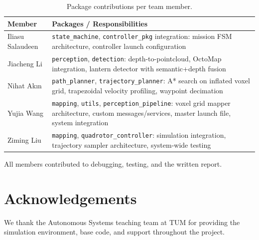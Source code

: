 \documentclass[twocolumn]{article}
\begin{document}
\begin{table}[h]
\centering
\caption{Package contributions per team member.}
\label{tab:contributions}
\small
\begin{tabularx}{\columnwidth}{lX}
\toprule
\textbf{Member} & \textbf{Packages / Responsibilities} \\
\midrule
Iliasu Salaudeen & \texttt{state\_machine}, \texttt{controller\_pkg} integration: mission FSM architecture, controller launch configuration \\
Jiacheng Li & \texttt{perception}, \texttt{detection}: depth-to-pointcloud, OctoMap integration, lantern detector with semantic+depth fusion \\
Nihat Ak{\i}n & \texttt{path\_planner}, \texttt{trajectory\_planner}: A* search on inflated voxel grid, trapezoidal velocity profiling, waypoint decimation \\
Yujia Wang & \texttt{mapping}, \texttt{utils}, \texttt{perception\_pipeline}: voxel grid mapper architecture, custom messages/services, master launch file, system integration \\
Ziming Liu & \texttt{mapping}, \texttt{quadrotor\_controller}: simulation integration, trajectory sampler architecture, system-wide testing \\
\bottomrule
\end{tabularx}
\end{table}

All members contributed to debugging, testing, and the written report.

\section*{Acknowledgements}
We thank the Autonomous Systems teaching team at TUM for providing the simulation environment, base code, and support throughout the project.

\printbibliography
\end{document}
